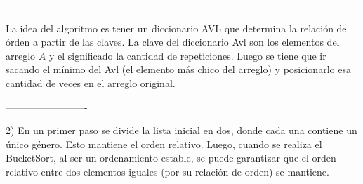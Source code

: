 -------------------


La idea del algoritmo es tener un diccionario AVL que determina la relación de órden a partir de las claves. La clave del diccionario Avl son los elementos del arreglo $A$ y el significado la cantidad 
de repeticiones. Luego se tiene que ir sacando el mínimo del Avl (el elemento más chico del arreglo) y posicionarlo esa cantidad de veces en el arreglo original.

-------------------------


2) En un primer paso se divide la lista inicial en dos, donde cada una contiene un único género. Esto mantiene el orden relativo.
Luego, cuando se realiza el BucketSort, al ser un ordenamiento estable, se puede garantizar que el orden relativo entre dos elementos iguales (por su relación de orden) se mantiene.

